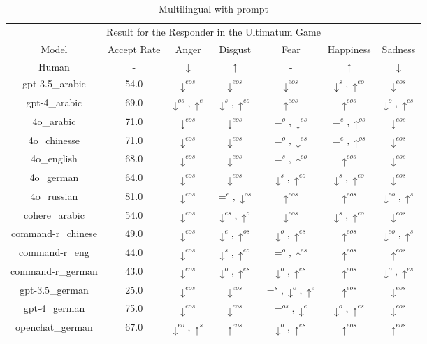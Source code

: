 \documentclass{article}
\begin{document}
\begin{table}
\begin{tabular}{ccccccc}
         \hline
        \multicolumn{7}{c}{Result for the Responder in the Ultimatum Game} \\
         Model & Accept Rate & Anger & Disgust & Fear & Happiness & Sadness \\

Human        & -  & $\downarrow$ & $\uparrow$ & -  & $\uparrow$ & $\downarrow$ \\

gpt-3.5\_arabic & 54.0 & $\downarrow^{eos}$ & $\downarrow^{eos}$ & $\downarrow^{eos}$ & $\downarrow^{s},\uparrow^{eo}$ & $\downarrow^{eos}$ \\
gpt-4\_arabic & 69.0 & $\downarrow^{os},\uparrow^{e}$ & $\downarrow^{s},\uparrow^{eo}$ & $\uparrow^{eos}$ & $\uparrow^{eos}$ & $\downarrow^{o},\uparrow^{es}$ \\
4o\_arabic & 71.0 & $\downarrow^{eos}$ & $\downarrow^{eos}$ & $=^{o},\downarrow^{es}$ & $=^{e},\uparrow^{os}$ & $\downarrow^{eos}$ \\
4o\_chinesse & 71.0 & $\downarrow^{eos}$ & $\downarrow^{eos}$ & $=^{o},\downarrow^{es}$ & $=^{e},\uparrow^{os}$ & $\downarrow^{eos}$ \\
4o\_english & 68.0 & $\downarrow^{eos}$ & $\downarrow^{eos}$ & $=^{s},\uparrow^{eo}$ & $\uparrow^{eos}$ & $\downarrow^{eos}$ \\
4o\_german & 64.0 & $\downarrow^{eos}$ & $\downarrow^{eos}$ & $\downarrow^{s},\uparrow^{eo}$ & $\downarrow^{s},\uparrow^{eo}$ & $\downarrow^{eos}$ \\
4o\_russian & 81.0 & $\downarrow^{eos}$ & $=^{e},\downarrow^{os}$ & $\uparrow^{eos}$ & $\uparrow^{eos}$ & $\downarrow^{eo},\uparrow^{s}$ \\
cohere\_arabic & 54.0 & $\downarrow^{eos}$ & $\downarrow^{es},\uparrow^{o}$ & $\downarrow^{eos}$ & $\downarrow^{s},\uparrow^{eo}$ & $\downarrow^{eos}$ \\
command-r\_chinese & 49.0 & $\downarrow^{eos}$ & $\downarrow^{e},\uparrow^{os}$ & $\downarrow^{o},\uparrow^{es}$ & $\uparrow^{eos}$ & $\downarrow^{eo},\uparrow^{s}$ \\
command-r\_eng & 44.0 & $\downarrow^{eos}$ & $\downarrow^{s},\uparrow^{eo}$ & $=^{o},\uparrow^{es}$ & $\uparrow^{eos}$ & $\uparrow^{eos}$ \\
command-r\_german & 43.0 & $\downarrow^{eos}$ & $\downarrow^{o},\uparrow^{es}$ & $\downarrow^{o},\uparrow^{es}$ & $\uparrow^{eos}$ & $\downarrow^{o},\uparrow^{es}$ \\
gpt-3.5\_german & 25.0 & $\downarrow^{eos}$ & $\downarrow^{eos}$ & $=^{s},\downarrow^{o},\uparrow^{e}$ & $\uparrow^{eos}$ & $\downarrow^{eos}$ \\
gpt-4\_german & 75.0 & $\downarrow^{eos}$ & $\downarrow^{eos}$ & $=^{os},\downarrow^{e}$ & $\downarrow^{o},\uparrow^{es}$ & $\downarrow^{eos}$ \\
openchat\_german & 67.0 & $\downarrow^{eo},\uparrow^{s}$ & $\uparrow^{eos}$ & $\downarrow^{o},\uparrow^{es}$ & $\uparrow^{eos}$ & $\uparrow^{eos}$ \\

         \hline
    \end{tabular}
    \caption{Multilingual with prompt}
    \label{tab:my_label}
\end{table}
\end{document}
